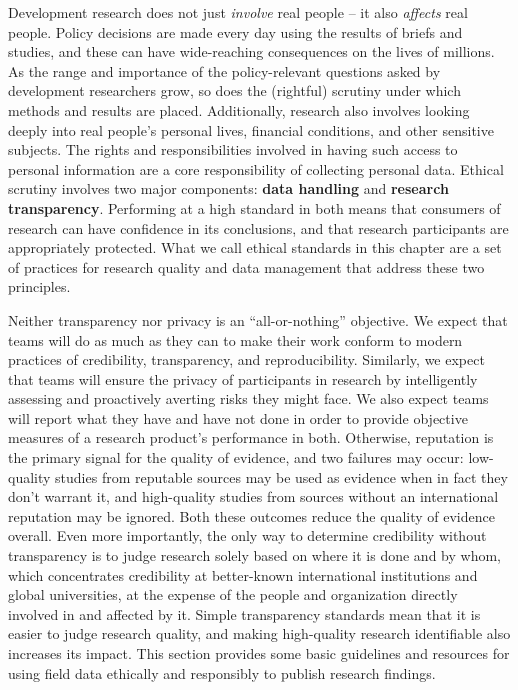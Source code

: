 
\begin{fullwidth}
	Development research does not just \textit{involve} real people -- it also \textit{affects} real people.
	Policy decisions are made every day using the results of briefs and studies,
	and these can have wide-reaching consequences on the lives of millions.
	As the range and importance of the policy-relevant questions
	asked by development researchers grow,
	so does the (rightful) scrutiny under which methods and results are placed.
	Additionally, research also involves looking deeply into real people's
	personal lives, financial conditions, and other sensitive subjects.
	The rights and responsibilities involved in having such access
	to personal information are a core responsibility of collecting personal data.
	Ethical scrutiny involves two major components: \textbf{data handling} and \textbf{research transparency}.
	Performing at a high standard in both means that
	consumers of research can have confidence in its conclusions,
	and that research participants are appropriately protected.
	What we call ethical standards in this chapter are a set of practices
	for research quality and data management that address these two principles.

	Neither transparency nor privacy is an ``all-or-nothing'' objective.
	We expect that teams will do as much as they can to make their work
	conform to modern practices of credibility, transparency, and reproducibility.
	Similarly, we expect that teams will ensure the privacy of participants in research
	by intelligently assessing and proactively averting risks they might face.
	We also expect teams will report what they have and have not done
	in order to provide objective measures of a research product's performance in both.
	Otherwise, reputation is the primary signal for the quality of evidence, and two failures may occur:
	low-quality studies from reputable sources may be used as evidence when in fact they don't warrant it,
	and high-quality studies from sources without an international reputation may be ignored.
	Both these outcomes reduce the quality of evidence overall.
	Even more importantly, the only way to determine credibility without transparency
  is to judge research solely based on where it is done and by whom,
  which concentrates credibility at better-known international institutions and global universities,
  at the expense of the people and organization directly involved in and affected by it.
	Simple transparency standards mean that it is easier to judge research quality,
	and making high-quality research identifiable also increases its impact.
	This section provides some basic guidelines and resources
	for using field data ethically and responsibly to publish research findings.
\end{fullwidth}

